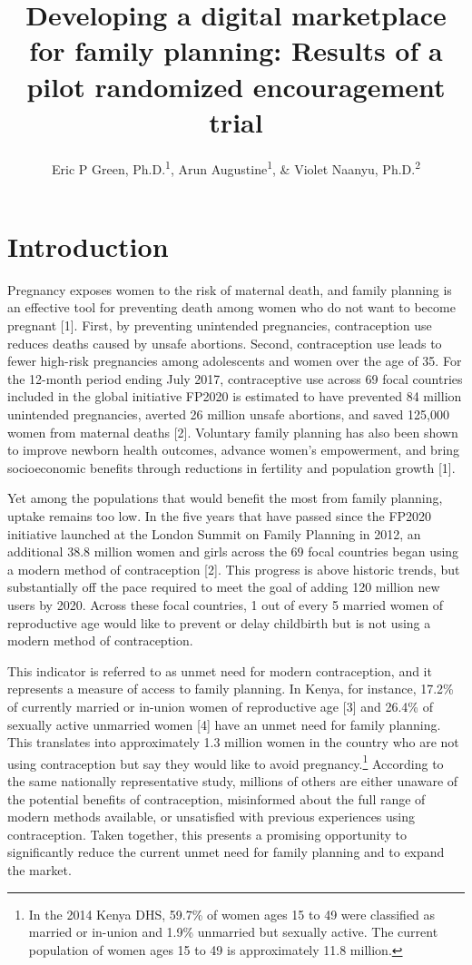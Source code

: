 \documentclass[man]{apa6}
\title{Developing a digital marketplace for family planning: Results of a pilot
randomized encouragement trial}
\author{Eric P Green, Ph.D.\textsuperscript{1}, Arun Augustine\textsuperscript{1}, \& Violet Naanyu, Ph.D.\textsuperscript{2}}
\affiliation{
    \vspace{0.5cm}
          \textsuperscript{1} Duke Global Health Institute, Duke University\\
          \textsuperscript{2} Department of Behavioral Sciences, School of Medicine, College of Health
Sciences, Moi University  }
\theoremstyle{definition}
\theoremstyle{definition}
\theoremstyle{definition}
\theoremstyle{remark}
\begin{document}
\maketitle

\setcounter{secnumdepth}{0}



\hypertarget{introduction}{%
\section{Introduction}\label{introduction}}

Pregnancy exposes women to the risk of maternal death, and family
planning is an effective tool for preventing death among women who do
not want to become pregnant {[}1{]}. First, by preventing unintended
pregnancies, contraception use reduces deaths caused by unsafe
abortions. Second, contraception use leads to fewer high-risk
pregnancies among adolescents and women over the age of 35. For the
12-month period ending July 2017, contraceptive use across 69 focal
countries included in the global initiative FP2020 is estimated to have
prevented 84 million unintended pregnancies, averted 26 million unsafe
abortions, and saved 125,000 women from maternal deaths {[}2{]}.
Voluntary family planning has also been shown to improve newborn health
outcomes, advance women's empowerment, and bring socioeconomic benefits
through reductions in fertility and population growth {[}1{]}.

Yet among the populations that would benefit the most from family
planning, uptake remains too low. In the five years that have passed
since the FP2020 initiative launched at the London Summit on Family
Planning in 2012, an additional 38.8 million women and girls across the
69 focal countries began using a modern method of contraception {[}2{]}.
This progress is above historic trends, but substantially off the pace
required to meet the goal of adding 120 million new users by 2020.
Across these focal countries, 1 out of every 5 married women of
reproductive age would like to prevent or delay childbirth but is not
using a modern method of contraception.

This indicator is referred to as unmet need for modern contraception,
and it represents a measure of access to family planning. In Kenya, for
instance, 17.2\% of currently married or in-union women of reproductive
age {[}3{]} and 26.4\% of sexually active unmarried women {[}4{]} have
an unmet need for family planning. This translates into approximately
1.3 million women in the country who are not using contraception but say
they would like to avoid pregnancy.\footnote{In the 2014 Kenya DHS,
  59.7\% of women ages 15 to 49 were classified as married or in-union
  and 1.9\% unmarried but sexually active. The current population of
  women ages 15 to 49 is approximately 11.8 million.} According to the
same nationally representative study, millions of others are either
unaware of the potential benefits of contraception, misinformed about
the full range of modern methods available, or unsatisfied with previous
experiences using contraception. Taken together, this presents a
promising opportunity to significantly reduce the current unmet need for
family planning and to expand the market.
\end{document}
